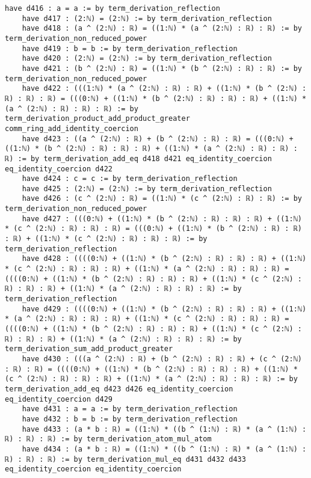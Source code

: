 \documentclass{article}
\begin{document}
\begin{tcolorbox}[colback=white!10, width=\linewidth]
\begin{lstlisting}[language=Lean4]
    have d416 : a = a := by term_derivation_reflection
    have d417 : (2:ℕ) = (2:ℕ) := by term_derivation_reflection
    have d418 : (a ^ (2:ℕ) : ℝ) = ((1:ℕ) * (a ^ (2:ℕ) : ℝ) : ℝ) := by term_derivation_non_reduced_power
    have d419 : b = b := by term_derivation_reflection
    have d420 : (2:ℕ) = (2:ℕ) := by term_derivation_reflection
    have d421 : (b ^ (2:ℕ) : ℝ) = ((1:ℕ) * (b ^ (2:ℕ) : ℝ) : ℝ) := by term_derivation_non_reduced_power
    have d422 : (((1:ℕ) * (a ^ (2:ℕ) : ℝ) : ℝ) + ((1:ℕ) * (b ^ (2:ℕ) : ℝ) : ℝ) : ℝ) = (((0:ℕ) + ((1:ℕ) * (b ^ (2:ℕ) : ℝ) : ℝ) : ℝ) + ((1:ℕ) * (a ^ (2:ℕ) : ℝ) : ℝ) : ℝ) := by term_derivation_product_add_product_greater comm_ring_add_identity_coercion
    have d423 : ((a ^ (2:ℕ) : ℝ) + (b ^ (2:ℕ) : ℝ) : ℝ) = (((0:ℕ) + ((1:ℕ) * (b ^ (2:ℕ) : ℝ) : ℝ) : ℝ) + ((1:ℕ) * (a ^ (2:ℕ) : ℝ) : ℝ) : ℝ) := by term_derivation_add_eq d418 d421 eq_identity_coercion eq_identity_coercion d422
    have d424 : c = c := by term_derivation_reflection
    have d425 : (2:ℕ) = (2:ℕ) := by term_derivation_reflection
    have d426 : (c ^ (2:ℕ) : ℝ) = ((1:ℕ) * (c ^ (2:ℕ) : ℝ) : ℝ) := by term_derivation_non_reduced_power
    have d427 : (((0:ℕ) + ((1:ℕ) * (b ^ (2:ℕ) : ℝ) : ℝ) : ℝ) + ((1:ℕ) * (c ^ (2:ℕ) : ℝ) : ℝ) : ℝ) = (((0:ℕ) + ((1:ℕ) * (b ^ (2:ℕ) : ℝ) : ℝ) : ℝ) + ((1:ℕ) * (c ^ (2:ℕ) : ℝ) : ℝ) : ℝ) := by term_derivation_reflection
    have d428 : ((((0:ℕ) + ((1:ℕ) * (b ^ (2:ℕ) : ℝ) : ℝ) : ℝ) + ((1:ℕ) * (c ^ (2:ℕ) : ℝ) : ℝ) : ℝ) + ((1:ℕ) * (a ^ (2:ℕ) : ℝ) : ℝ) : ℝ) = ((((0:ℕ) + ((1:ℕ) * (b ^ (2:ℕ) : ℝ) : ℝ) : ℝ) + ((1:ℕ) * (c ^ (2:ℕ) : ℝ) : ℝ) : ℝ) + ((1:ℕ) * (a ^ (2:ℕ) : ℝ) : ℝ) : ℝ) := by term_derivation_reflection
    have d429 : ((((0:ℕ) + ((1:ℕ) * (b ^ (2:ℕ) : ℝ) : ℝ) : ℝ) + ((1:ℕ) * (a ^ (2:ℕ) : ℝ) : ℝ) : ℝ) + ((1:ℕ) * (c ^ (2:ℕ) : ℝ) : ℝ) : ℝ) = ((((0:ℕ) + ((1:ℕ) * (b ^ (2:ℕ) : ℝ) : ℝ) : ℝ) + ((1:ℕ) * (c ^ (2:ℕ) : ℝ) : ℝ) : ℝ) + ((1:ℕ) * (a ^ (2:ℕ) : ℝ) : ℝ) : ℝ) := by term_derivation_sum_add_product_greater
    have d430 : (((a ^ (2:ℕ) : ℝ) + (b ^ (2:ℕ) : ℝ) : ℝ) + (c ^ (2:ℕ) : ℝ) : ℝ) = ((((0:ℕ) + ((1:ℕ) * (b ^ (2:ℕ) : ℝ) : ℝ) : ℝ) + ((1:ℕ) * (c ^ (2:ℕ) : ℝ) : ℝ) : ℝ) + ((1:ℕ) * (a ^ (2:ℕ) : ℝ) : ℝ) : ℝ) := by term_derivation_add_eq d423 d426 eq_identity_coercion eq_identity_coercion d429
    have d431 : a = a := by term_derivation_reflection
    have d432 : b = b := by term_derivation_reflection
    have d433 : (a * b : ℝ) = ((1:ℕ) * ((b ^ (1:ℕ) : ℝ) * (a ^ (1:ℕ) : ℝ) : ℝ) : ℝ) := by term_derivation_atom_mul_atom
    have d434 : (a * b : ℝ) = ((1:ℕ) * ((b ^ (1:ℕ) : ℝ) * (a ^ (1:ℕ) : ℝ) : ℝ) : ℝ) := by term_derivation_mul_eq d431 d432 d433 eq_identity_coercion eq_identity_coercion

\end{lstlisting}
\end{tcolorbox}
\end{document}
